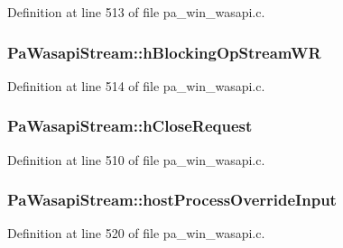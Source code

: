 Definition at line 513 of file pa\+\_\+win\+\_\+wasapi.\+c.

\subsubsection[{\texorpdfstring{h\+Blocking\+Op\+Stream\+WR}{hBlockingOpStreamWR}}]{ Pa\+Wasapi\+Stream\+::h\+Blocking\+Op\+Stream\+WR}\hypertarget{struct_pa_wasapi_stream_a0be8d98886549882563c9b16c2b3009f}{}\label{struct_pa_wasapi_stream_a0be8d98886549882563c9b16c2b3009f}


Definition at line 514 of file pa\+\_\+win\+\_\+wasapi.\+c.

\subsubsection[{\texorpdfstring{h\+Close\+Request}{hCloseRequest}}]{ Pa\+Wasapi\+Stream\+::h\+Close\+Request}\hypertarget{struct_pa_wasapi_stream_afae3ff3b21cdba0ada40c7f8660d667b}{}\label{struct_pa_wasapi_stream_afae3ff3b21cdba0ada40c7f8660d667b}


Definition at line 510 of file pa\+\_\+win\+\_\+wasapi.\+c.

\subsubsection[{\texorpdfstring{host\+Process\+Override\+Input}{hostProcessOverrideInput}}]{ Pa\+Wasapi\+Stream\+::host\+Process\+Override\+Input}\hypertarget{struct_pa_wasapi_stream_a07ec66d5779ded1801200467021884e1}{}\label{struct_pa_wasapi_stream_a07ec66d5779ded1801200467021884e1}


Definition at line 520 of file pa\+\_\+win\+\_\+wasapi.\+c.

